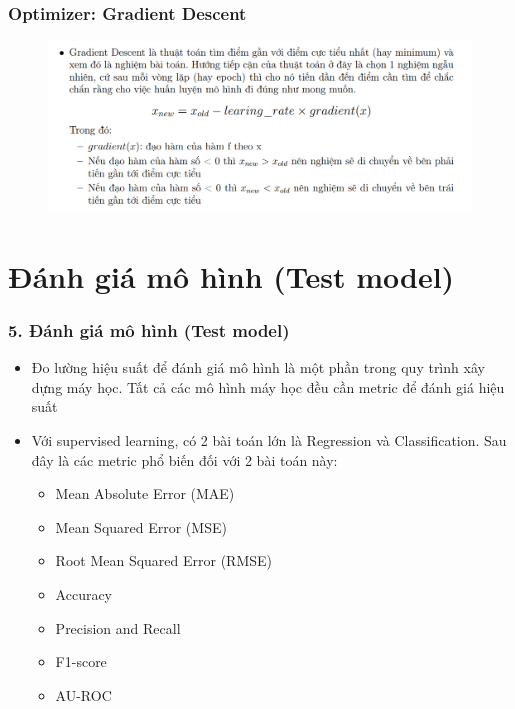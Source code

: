 \documentclass{beamer}
\begin{document}
\begin{frame}
\frametitle{Optimizer: Gradient Descent}
\begin{figure}
    \centering
    \includegraphics[width=1\linewidth]{gra.png}
    
    
\end{figure}
\end{frame}

\section{Đánh giá mô hình (Test model)}

\begin{frame}
\frametitle{5. Đánh giá mô hình (Test model)}
\begin{itemize}
\item Đo lường hiệu suất để đánh giá mô hình là một phần trong quy trình xây dựng máy học. Tất cả các mô hình máy học đều cần metric để đánh giá hiệu suất
\item Với supervised learning, có 2 bài toán lớn là Regression và Classification. Sau đây là các
metric phổ biến đối với 2 bài toán này:
\begin{itemize}
    \item  Mean Absolute Error (MAE)
    \item Mean Squared Error (MSE)
    \item Root Mean Squared Error (RMSE)
    \item Accuracy
    \item Precision and Recall
    \item F1-score
    \item AU-ROC
\end{itemize}

\end{itemize}
\end{frame}
\end{document}
